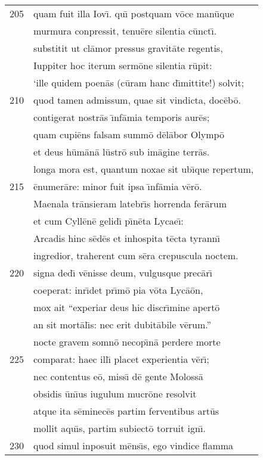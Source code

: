 \documentclass[paper=6in:9in,pagesize=pdftex,
               headinclude=on,footinclude=on,12pt]{scrbook}
\begin{document}
\begin{longtable}[p]{ r l }
205 & quam fuit illa Iov\={\i}. qu\={\i} postquam v\=oce man\=uque\\ 
 & murmura conpressit, tenu\=ere silentia c\=unct\={\i}.\\ 
 & substitit ut cl\=amor pressus gravit\=ate regentis,\\ 
 & Iuppiter hoc iterum serm\=one silentia r\=upit:\\ 
 & `ille quidem poen\=as (c\=uram hanc d\={\i}mittite!) solvit;\\ 
210 & quod tamen admissum, quae sit vindicta, doc\=eb\=o.\\ 
 & contigerat nostr\=as \={\i}nf\=amia temporis aur\=es;\\ 
 & quam cupi\=ens falsam summ\=o d\=el\=abor Olymp\=o\\ 
 & et deus h\=um\=an\=a l\=ustr\=o sub im\=agine terr\=as.\\ 
 & longa mora est, quantum noxae sit ub\={\i}que repertum,\\ 
215 & \=enumer\=are: minor fuit ipsa \={\i}nf\=amia v\=er\=o.\\ 
 & Maenala tr\=ansieram latebr\={\i}s horrenda fer\=arum\\ 
 & et cum Cyll\=en\=e gelid\={\i} p\={\i}n\=eta Lycae\={\i}:\\ 
 & Arcadis hinc s\=ed\=es et inhospita t\=ecta tyrann\={\i}\\ 
 & ingredior, traherent cum s\=era crepuscula noctem.\\ 
220 & signa ded\={\i} v\=enisse deum, vulgusque prec\=ar\={\i}\\ 
 & coeperat: inr\={\i}det pr\={\i}m\=o pia v\=ota Lyc\=a\=on,\\ 
 & mox ait ``experiar deus hic discr\={\i}mine apert\=o\\ 
 & an sit mort\=al\={\i}s: nec erit dubit\=abile v\=erum.''\\ 
 & nocte gravem somn\=o necop\={\i}n\=a perdere morte\\ 
225 & comparat: haec ill\={\i} placet experientia v\=er\={\i};\\ 
 & nec contentus e\=o, miss\={\i} d\=e gente Moloss\=a\\ 
 & obsidis \=un\={\i}us iugulum mucr\=one resolvit\\ 
 & atque ita s\=eminec\=es partim ferventibus art\=us\\ 
 & mollit aqu\={\i}s, partim subiect\=o torruit ign\={\i}.\\ 
230 & quod simul inposuit m\=ens\={\i}s, ego vindice flamma\\ 

\end{longtable}
\end{document}
